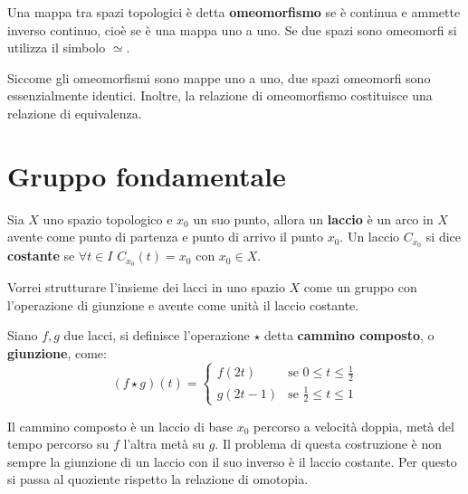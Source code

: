\begin{definition}
  Una mappa tra spazi topologici è detta \textbf{omeomorfismo} se è continua
  e ammette inverso continuo, cioè se è una mappa uno a uno. Se due spazi sono omeomorfi si utilizza
  il simbolo $ \simeq $.
\end{definition}
Siccome gli omeomorfismi sono mappe uno a uno, due spazi omeomorfi sono
essenzialmente identici. Inoltre, la relazione di omeomorfismo costituisce una
relazione di equivalenza.




\section{Gruppo fondamentale}

\begin{definition}
  Sia $ X $ uno spazio topologico e $ x_0 $ un suo punto, allora un \textbf{laccio} è un arco in $ X $
  avente come punto di partenza e punto di arrivo il punto $ x_0 $. Un laccio $ C_{x_0} $ si dice \textbf{costante} se $ \forall t \in I $
  $ C_{x_0}(t) = x_0 $ con $ x_0 \in X $.
\end{definition}
\noindent
Vorrei strutturare l'insieme dei lacci in uno spazio $ X $ come un gruppo con l'operazione di giunzione
e avente come unità il laccio costante.

\begin{definition}
  Siano $ f, g $ due lacci, si definisce l'operazione $ \star $ detta \textbf{cammino
    composto}, o \textbf{giunzione}, 
   come:
  \[
    (f \star g)(t) =
    \begin{cases}
      f(2t) & \text{se } 0 \leq t \leq \frac{1}{2} \\
      g(2t -1) & \text{se } \frac{1}{2} \leq t \leq 1
    \end{cases}
  \]
\end{definition}
Il cammino composto è un laccio di base $ x_0 $ percorso a velocità doppia,
metà del tempo percorso su $ f $ l'altra metà su $ g $.
Il problema di questa costruzione è non sempre la giunzione di un laccio con il
suo inverso è il laccio costante. Per questo si passa al quoziente rispetto la
relazione di omotopia.


